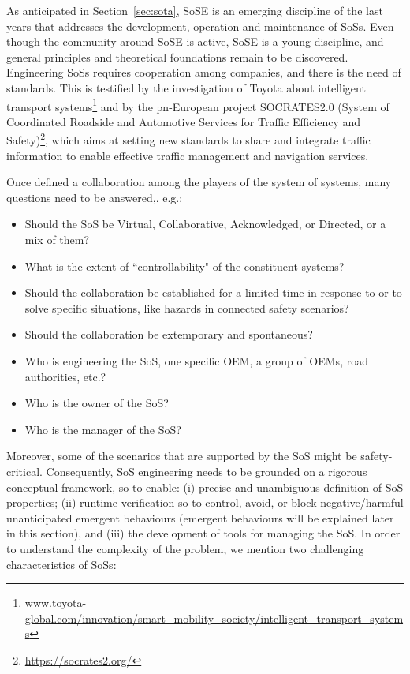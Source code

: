






As anticipated in Section~\ref{sec:sota}, SoSE is an emerging discipline of the last years that addresses the development,
operation and maintenance of SoSs. Even though the community around SoSE is active, SoSE is a
young discipline, and general principles and theoretical foundations remain to be discovered. 
Engineering SoSs requires cooperation among companies, and there is the need of standards. This is testified by the investigation of Toyota about intelligent transport systems\footnote{ \url{www.toyota-global.com/innovation/smart_mobility_society/intelligent_transport_systems}} and by the 
pn-European project SOCRATES2.0 (System of Coordinated Roadside and Automotive Services for Traffic Efficiency and Safety)\footnote{\url{https://socrates2.org/}}, which aims at setting new standards to share and integrate traffic information to enable effective traffic management and navigation services.

Once defined a collaboration among the players of the system of systems, many questions need to be answered,. e.g.:

\begin{itemize}
\item Should the SoS be Virtual, Collaborative, Acknowledged, or Directed, or a mix of them?
\item What is the extent of ``controllability" of the constituent systems?
\item Should the collaboration be established for a limited time in response to or to solve specific situations, like hazards in connected safety scenarios?
\item Should the collaboration be extemporary and spontaneous?
\item Who is engineering the SoS, one specific OEM, a group of OEMs, road authorities, etc.?
\item Who is the owner of the SoS?
\item Who is the manager of the SoS?
\end{itemize}

Moreover, some of the scenarios that are supported by the SoS might be safety-critical. Consequently, SoS engineering needs to be grounded on a rigorous conceptual framework, so to enable: (i) precise and unambiguous definition of SoS properties; (ii) runtime
verification so to control, avoid, or block negative/harmful unanticipated emergent behaviours (emergent behaviours will be explained later in this section), and (iii) the development
of tools for managing the SoS. 
In order to understand the complexity of the problem, we mention two challenging characteristics of SoSs: 

